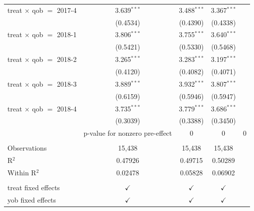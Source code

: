 \begin{table}[H]
\begin{tabular}{lccc}
      treat $\times$ qob $=$ 2017-4  & 3.639$^{***}$ & 3.488$^{***}$  & 3.367$^{***}$\\   
                                     & (0.4534)      & (0.4390)       & (0.4338)\\   
      treat $\times$ qob $=$ 2018-1  & 3.806$^{***}$ & 3.755$^{***}$  & 3.640$^{***}$\\   
                                     & (0.5421)      & (0.5330)       & (0.5468)\\   
      treat $\times$ qob $=$ 2018-2  & 3.265$^{***}$ & 3.283$^{***}$  & 3.197$^{***}$\\   
                                     & (0.4120)      & (0.4082)       & (0.4071)\\   
      treat $\times$ qob $=$ 2018-3  & 3.889$^{***}$ & 3.932$^{***}$  & 3.807$^{***}$\\   
                                     & (0.6159)      & (0.5946)       & (0.5947)\\   
      treat $\times$ qob $=$ 2018-4  & 3.735$^{***}$ & 3.779$^{***}$  & 3.686$^{***}$\\   
                                     & (0.3039)      & (0.3388)       & (0.3450)\\   
       & p-value for nonzero pre-effect & 0 & 0 & 0\\
       \\
      Observations                   & 15,438        & 15,438         & 15,438\\  
      R$^2$                          & 0.47926       & 0.49715        & 0.50289\\  
      Within R$^2$                   & 0.02478       & 0.05828        & 0.06902\\  
       \\
      treat fixed effects            & $\checkmark$  & $\checkmark$   & $\checkmark$\\   
      yob fixed effects              & $\checkmark$  & $\checkmark$   & $\checkmark$\\   
      \bottomrule
   \end{tabular}
\end{table}


